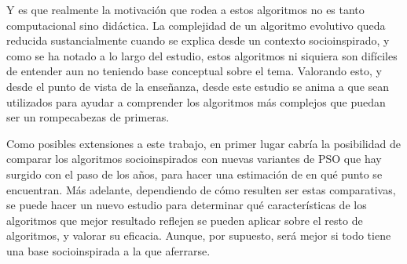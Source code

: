 Y es que realmente la motivación que rodea a estos algoritmos no es tanto computacional sino didáctica. La complejidad de un algoritmo evolutivo queda reducida sustancialmente cuando se explica desde un contexto socioinspirado, y como se ha notado a lo largo del estudio, estos algoritmos ni siquiera son difíciles de entender aun no teniendo base conceptual sobre el tema. Valorando esto, y desde el punto de vista de la enseñanza, desde este estudio se anima a que sean utilizados para ayudar a comprender los algoritmos más complejos que puedan ser un rompecabezas de primeras.

Como posibles extensiones a este trabajo, en primer lugar cabría la posibilidad de comparar los algoritmos socioinspirados con nuevas variantes de PSO que hay surgido con el paso de los años, para hacer una estimación de en qué punto se encuentran. Más adelante, dependiendo de cómo resulten ser estas comparativas, se puede hacer un nuevo estudio para determinar qué características de los algoritmos que mejor resultado reflejen se pueden aplicar sobre el resto de algoritmos, y valorar su eficacia. Aunque, por supuesto, será mejor si todo tiene una base socioinspirada a la que aferrarse.